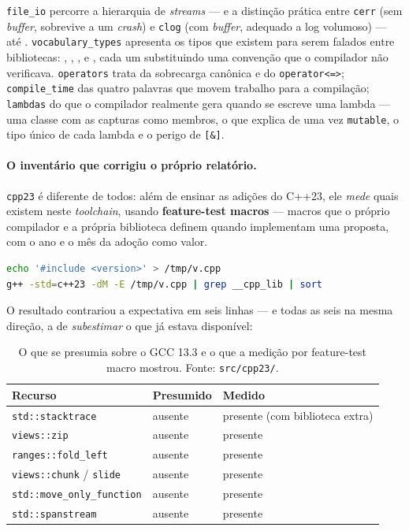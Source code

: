 \texttt{file\_io} percorre a hierarquia de \emph{streams} --- e a distinção
prática entre \texttt{cerr} (sem \emph{buffer}, sobrevive a um \emph{crash}) e
\texttt{clog} (com \emph{buffer}, adequado a log volumoso) --- até
. \texttt{vocabulary\_types} apresenta os tipos que
existem para serem falados entre bibliotecas: ,
, ,  e
, cada um substituindo uma convenção que o compilador não
verificava. \texttt{operators} trata da sobrecarga canônica e do
\texttt{operator<=>}; \texttt{compile\_time} das quatro palavras que movem
trabalho para a compilação; \texttt{lambdas} do que o compilador realmente gera
quando se escreve uma lambda --- uma classe com as capturas como membros, o que
explica de uma vez \texttt{mutable}, o tipo único de cada lambda e o perigo de
\texttt{[\&]}.

\paragraph{O inventário que corrigiu o próprio relatório.}
\texttt{cpp23} é diferente de todos: além de ensinar as adições do C++23, ele
\emph{mede} quais existem neste \emph{toolchain}, usando \textbf{feature-test
macros} --- macros que o próprio compilador e a própria biblioteca definem
quando implementam uma proposta, com o ano e o mês da adoção como valor.

\begin{lstlisting}[style=bt, language=bash,
    caption={O comando que despeja o inventário completo da biblioteca, citado
             em \texttt{src/cpp23/}.}]
echo '#include <version>' > /tmp/v.cpp
g++ -std=c++23 -dM -E /tmp/v.cpp | grep __cpp_lib | sort
\end{lstlisting}

O resultado contrariou a expectativa em seis linhas --- e todas as seis na mesma
direção, a de \emph{subestimar} o que já estava disponível:

\begin{table}[htbp]
\centering
\caption{O que se presumia sobre o GCC 13.3 e o que a medição por feature-test
         macro mostrou. Fonte: \texttt{src/cpp23/}.}
\label{tab:cpp23-medido}
\footnotesize
\begin{tabular}{@{}lll@{}}
\toprule
\textbf{Recurso} & \textbf{Presumido} & \textbf{Medido} \\
\midrule
\texttt{std::stacktrace}          & ausente & presente (com biblioteca extra) \\
\texttt{views::zip}               & ausente & presente \\
\texttt{ranges::fold\_left}       & ausente & presente \\
\texttt{views::chunk} / \texttt{slide} & ausente & presente \\
\texttt{std::move\_only\_function}& ausente & presente \\
\texttt{std::spanstream}          & ausente & presente \\
\bottomrule
\end{tabular}
\end{table}


